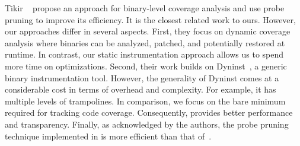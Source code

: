 {Tikir \etal~\cite{Tikir2002} propose an approach for binary-level coverage analysis and use probe pruning to improve its efficiency.
It is the closest related work to ours. 
However, our approaches differ in several aspects. 
First, they focus on dynamic coverage analysis where binaries can be analyzed, patched, and potentially restored at runtime.
In contrast, our static instrumentation approach allows us to spend more time on optimizations.
Second, their work builds on Dyninst~\cite{DyninstWeb}, a generic binary instrumentation tool.
However, the generality of Dyninst comes at a considerable cost in terms of overhead and complexity. 
For example, it has multiple levels of trampolines.
In comparison, we focus on the bare minimum required for tracking code coverage. 
Consequently, {\bcov} provides better performance and transparency.
Finally, as acknowledged by the authors, the probe pruning
technique implemented in \bcov{} is more efficient than that of~\cite{Tikir2002}. 



%  
%
% 


%
% 
%
%




%

%


}
